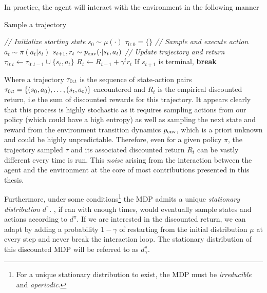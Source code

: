 In practice, the agent will interact with the environment in the following manner

\begin{center}
\begin{minipage}{0.9\textwidth}
\begin{algorithm}[H]
\caption{Sample a trajectory}
\label{alg:sample_traj}
\begin{algorithmic}[1]
\STATE \textit{// Initialize starting state}
\STATE $s_0 \sim \mu(\cdot)$
\STATE $\tau_{0:0} = \{ \}$
\STATE \textit{// Sample and execute action}
\STATE $a_t \sim \pi(a_t|s_t)$
\STATE $s_{t+1}, r_t \sim p_{\text{env}}(\cdot | s_t, a_t)$
\STATE \textit{// Update trajectory and return}
\STATE $\tau_{0:t} \leftarrow \tau_{0:t-1} \cup \{s_t, a_t\}$
\STATE $R_t \leftarrow R_{t-1} + \gamma^t r_t$
\STATE If $s_{t+1}$ is terminal, \textbf{break}
\ENDFOR
\end{algorithmic}
\end{algorithm}
\end{minipage}
\end{center}
\vspace{1em}

Where a trajectory $\tau_{0:t}$ is the sequence of state-action pairs $\tau_{0:t}=\{(s_0,a_0), \ldots,(s_t, a_t) \}$ encountered and $R_t$ is the empirical discounted return, i.e the sum of discounted rewards for this trajectory. It appears clearly that this process is highly stochastic as it requires sampling actions from our policy (which could have a high entropy) as well as sampling the next state and reward from the environment transition dynamics $p_{\text{env}}$, which is a priori unknown and could be highly unpredictable. Therefore, even for a given policy $\pi$, the trajectory sampled $\tau$ and its associated discounted return $R_t$ can be vastly different every time  is run. This \emph{noise} arising from the interaction between the agent and the environment at the core of most contributions presented in this thesis.

Furthermore, under some conditions\footnote{For a unique stationary distribution to exist, the MDP must be \emph{irreducible} and \emph{aperiodic}.} the MDP admits a unique \emph{stationary distribution} $d^\pi$. , if ran with enough times, would eventually sample states and actions according to $d^\pi$. If we are interested in the discounted return, we can adapt  by adding a probability $1-\gamma$ of restarting from the initial distribution $\mu$ at every step and never break the interaction loop. The stationary distribution of this discounted MDP will be referred to as $d^\pi_\gamma$.

